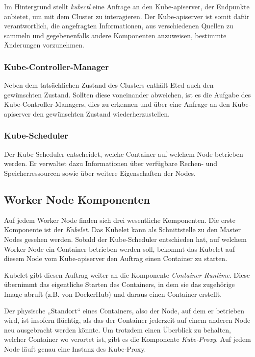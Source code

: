 \documentclass[11pt,a4paper]{article}
\begin{document}
Im Hintergrund stellt \emph{kubectl} eine Anfrage an den Kube-apiserver, der Endpunkte anbietet, 
um mit dem Cluster zu interagieren. Der Kube-apiserver ist somit dafür verantwortlich, die angefragten Informationen,
aus verschiedenen Quellen zu sammeln und gegebenenfalls andere Komponenten anzuweisen, bestimmte Änderungen vorzunehmen.

\subsubsection{Kube-Controller-Manager}
Neben dem tatsächlichen Zustand des Clusters enthält Etcd auch den gewünschten Zustand.
Sollten diese voneinander abweichen, ist es die Aufgabe des Kube-Controller-Managers,
dies zu erkennen und über eine Anfrage an den Kube-apiserver den gewünschten Zustand wiederherzustellen.


\subsubsection{Kube-Scheduler}
\label{sec:Kube-Scheduler}
Der Kube-Scheduler entscheidet, welche Container auf welchem Node betrieben werden.
Er verwaltet dazu Informationen über verfügbare Rechen- und Speicherressourcen sowie über weitere Eigenschaften
der Nodes. 
\subsection{Worker Node Komponenten}

Auf jedem Worker Node finden sich drei wesentliche Komponenten.
Die erste Komponente ist der \emph{Kubelet}. Das Kubelet kann als Schnittstelle
zu den Master Nodes gesehen werden. Sobald der Kube-Scheduler entschieden hat, auf welchem
Worker Node ein Container betrieben werden soll, bekommt das Kubelet auf diesem Node 
vom Kube-apiserver den Auftrag einen Container zu starten.

Kubelet gibt diesen Auftrag weiter an die Komponente \emph{Container Runtime}.
Diese übernimmt das eigentliche Starten des Containers, in dem sie das zugehörige Image
abruft (z.B. von DockerHub) und daraus einen Container erstellt.

Der physische „Standort“ eines Containers, also der Node, auf dem er betrieben wird, ist insofern
flüchtig, als das der Container jederzeit auf einem anderen Node neu ausgebracht werden könnte.
Um trotzdem einen Überblick zu behalten, welcher Container wo verortet ist, gibt es die Komponente
\emph{Kube-Proxy}. Auf jedem Node läuft genau eine Instanz des Kube-Proxy.
\end{document}
